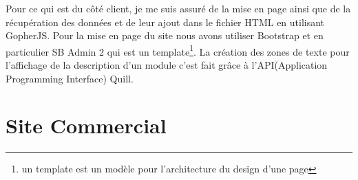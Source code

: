 \documentclass[12pt,a4paper]{report}
\begin{document}
Pour ce qui est du côté client, je me suis assuré de la mise en page ainsi que de la  récupération des données et de leur ajout dans le fichier HTML en utilisant GopherJS. Pour la mise en page du site nous avons utiliser Bootstrap et en particulier SB Admin 2 qui est un template\footnote{un template est un modèle pour l'architecture du design d'une page }. La création des zones de texte pour l'affichage de la description d'un module c'est fait grâce à l'API(Application Programming Interface) Quill.

\section{Site Commercial}
\end{document}
